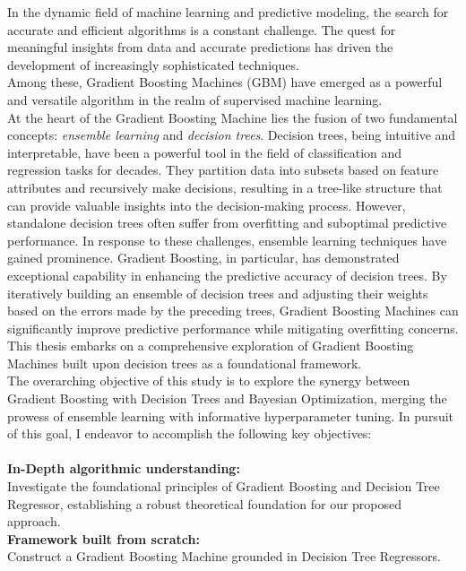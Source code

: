 \documentclass[12pt, a4paper]{article}
\begin{document}
In the dynamic field of machine learning and predictive modeling, the search for accurate and efficient algorithms is a constant challenge. The quest for meaningful insights from data and accurate predictions has driven the development of increasingly sophisticated techniques. \\
Among these, Gradient Boosting Machines (GBM) have emerged as a powerful and versatile algorithm in the realm of supervised machine learning. \\
At the heart of the Gradient Boosting Machine lies the fusion of two fundamental concepts: \textit{ensemble learning} and \textit{decision trees}. Decision trees, being intuitive and interpretable, have been a powerful tool in the field of classification and regression tasks for decades. They partition data into subsets based on feature attributes and recursively make decisions, resulting in a tree-like structure that can provide valuable insights into the decision-making process. However, standalone decision trees often suffer from overfitting and suboptimal predictive performance. In response to these challenges, ensemble learning techniques have gained prominence. Gradient Boosting, in particular, has demonstrated exceptional capability in enhancing the predictive accuracy of decision trees. By iteratively building an ensemble of decision trees and adjusting their weights based on the errors made by the preceding trees, Gradient Boosting Machines can significantly improve predictive performance while mitigating overfitting concerns. \\
This thesis embarks on a comprehensive exploration of Gradient Boosting Machines built upon decision trees as a foundational framework. \\
The overarching objective of this study is to explore the synergy between Gradient Boosting with Decision Trees and Bayesian Optimization, merging the prowess of ensemble learning with informative hyperparameter tuning. In pursuit of this goal, I endeavor to accomplish the following key objectives:\\
\vspace{0.5cm} \\
\textbf{In-Depth algorithmic understanding:}  \\
Investigate the foundational principles of Gradient Boosting and Decision Tree Regressor, establishing a robust theoretical foundation for our proposed approach. 
\\
\textbf{Framework built from scratch:} \\
Construct a Gradient Boosting Machine grounded in Decision Tree Regressors. \\
\end{document}
